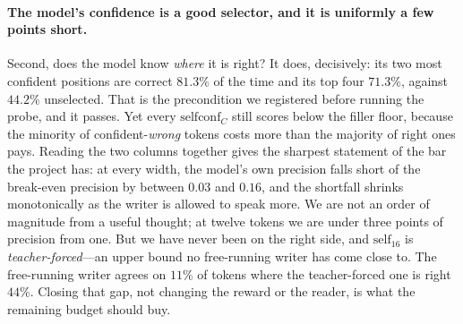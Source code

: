 \documentclass{article} %
\begin{document}
\paragraph{The model's confidence is a good selector, and it is uniformly a few points short.} Second, does the model know \emph{where} it is right? It does, decisively: its two most confident positions are correct $81.3\%$ of the time and its top four $71.3\%$, against $44.2\%$ unselected. That is the precondition we registered before running the probe, and it passes. Yet every $\mathrm{selfconf}_C$ still scores below the filler floor, because the minority of confident-\emph{wrong} tokens costs more than the majority of right ones pays. Reading the two columns together gives the sharpest statement of the bar the project has: at every width, the model's own precision falls short of the break-even precision by between $0.03$ and $0.16$, and the shortfall shrinks monotonically as the writer is allowed to speak more. We are not an order of magnitude from a useful thought; at twelve tokens we are under three points of precision from one. But we have never been on the right side, and $\mathrm{self}_{16}$ is \emph{teacher-forced}---an upper bound no free-running writer has come close to. The free-running writer agrees on $11\%$ of tokens where the teacher-forced one is right $44\%$. Closing that gap, not changing the reward or the reader, is what the remaining budget should buy.
\end{document}
